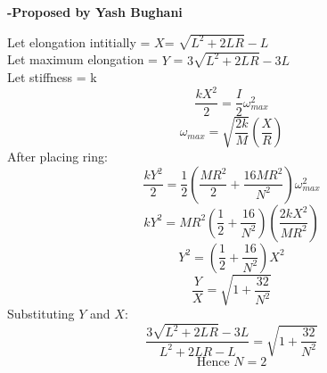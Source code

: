 \documentclass[11pt,a4paper]{scrartcl}
\begin{document}
\begin{flushright}
\textbf{\Large{-Proposed by Yash Bughani}}
\end{flushright}
\begin{solution}
Let elongation intitially = $X $= $\sqrt{L^2+2LR}-L$\\
Let maximum elongation  = $Y$ = $3\sqrt{L^2+2LR}-3L$\\
Let stiffness = k\\
$$\frac{kX^2}{2}=\frac{I}{2}\omega_{max}^2$$
$$\boxed{\omega_{max}=\sqrt{\frac{2k}{M}}\left(\frac{X}{R}\right)}$$
After placing ring:\\
$$\frac{kY^2}{2}=\frac{1}2{}\left(\frac{MR^2}{2}+\frac{16MR^2}{N^2}\right)\omega_{max}^2$$
$${kY^2}=MR^2\left(\frac{1}{2}+\frac{16}{N^2}\right)\left(\frac{2kX^2}{MR^2}\right)$$
$${Y^2}=\left(\frac{1}{2}+\frac{16}{N^2}\right)X^2$$
$$\frac{Y}{X}=\sqrt{1+\frac{32}{N^2}}$$
Substituting $Y$ and $X$:\\
$$\frac{3\sqrt{L^2+2LR}-3L}{{L^2+2LR}-L}=\sqrt{1+\frac{32}{N^2}} $$
$$\text{Hence }\boxed{N=2}$$
\end{solution}
\vspace{1cm}%
\end{document}
